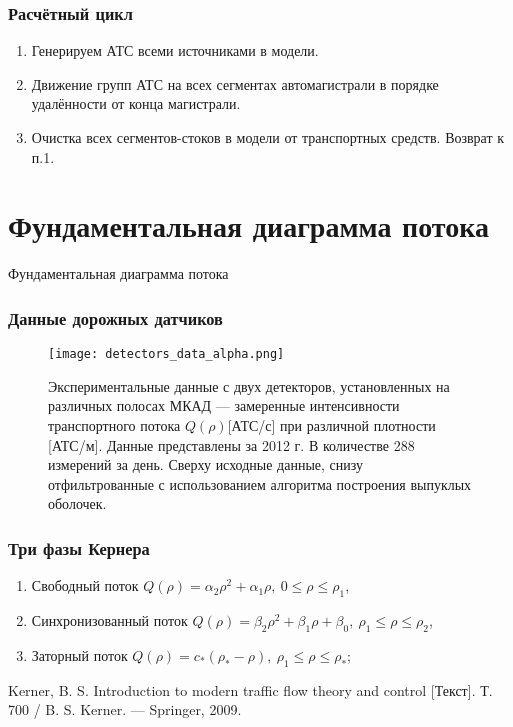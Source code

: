 \begin{frame}
    \frametitle{Расчётный цикл}
    \begin{enumerate}
      \item Генерируем АТС всеми источниками в модели.
      \item Движение групп АТС на всех сегментах автомагистрали в порядке удалённости от конца магистрали.
      \item Очистка всех сегментов-стоков в модели от транспортных средств. Возврат к п.1.
    \end{enumerate}
\end{frame}

\section{Фундаментальная диаграмма потока}
\begin{frame}
    \begin{center}
        \Huge
        Фундаментальная диаграмма потока
    \end{center}
\end{frame}

\begin{frame}
    \frametitle{Данные дорожных датчиков}
    \begin{figure}[ht]
        \begin{center}
            \texttt{[image: detectors\_data\_alpha.png]}
            \caption{Экспериментальные данные с двух детекторов, установленных на различных полосах МКАД --- замеренные интенсивности транспортного потока \(Q(\rho)\)[АТС/с] при различной плотности [АТС/м]. Данные представлены за 2012 г. В количестве 288 измерений за день. Сверху исходные данные, снизу отфильтрованные с использованием алгоритма построения выпуклых оболочек.}
        \end{center}
    \end{figure}
\end{frame}

\begin{frame}
    \frametitle{Три фазы Кернера}
    \begin{enumerate}
      \item Свободный поток \(Q(\rho) = \alpha_2\rho^2 + \alpha_1\rho,\ 0\leq\rho\leq\rho_1\),
      \item Синхронизованный поток \(Q(\rho) = \beta_2\rho^2 + \beta_1\rho + \beta_0,\ \rho_1\leq\rho\leq\rho_2\),
      \item Заторный поток \(Q(\rho) = c_*(\rho_*-\rho),\ \rho_1\leq\rho\leq\rho_*\);
    \end{enumerate}

    Kerner, B. S. Introduction to modern traffic flow theory and control [Текст]. Т. 700 / B. S. Kerner. — Springer, 2009.
\end{frame}


